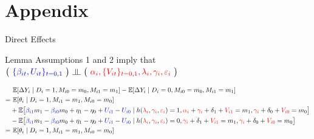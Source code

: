 \documentclass[aspectratio=1610, 9pt]{beamer}
\newcommand{\indep}{\rotatebox[origin=c]{90}{$\models$}}
\begin{document}
\appendix

\section{Appendix}



\begin{frame}{Direct Effects}

\begin{block}{Lemma}
   Assumptions 1 and 2 imply that $  \big(\ \textcolor{blue}{\{\beta_{it},U_{it}\}_{t=0,1}} \ \big) \ \indep\ \big(\ \textcolor{red}{\alpha_i,\{V_{it}\}_{t=0,1},\lambda_i,\gamma_i,\varepsilon_i}\ \big)$
\end{block}

\begin{align*}
    &\ \mathbb E[\Delta Y_i \mid D_i=1, M_{i0}=m_0, M_{i1}=m_1]- \mathbb E[\Delta Y_i \mid D_i=0, M_{i0}=m_0, M_{i1}=m_1]\\
    =&\ \mathbb E[\theta_i \mid D_i=1, M_{i1}=m_1, M_{i0}=m_0]\\
    & + \mathbb E\big[\textcolor{blue}{\beta_{i1}}m_{1}-\textcolor{blue}{\beta_{i0}}m_{0}+\eta_1-\eta_0 + \textcolor{blue}{U_{i1}}-\textcolor{blue}{U_{i0}}\mid h(\textcolor{red}{\lambda_i}, \textcolor{red}{\gamma_i},\textcolor{red}{\varepsilon_i})=1, \textcolor{red}{\alpha_i}+\textcolor{red}{\gamma_i}+\delta_1+\textcolor{red}{V_{i1}}=m_1, \textcolor{red}{\gamma_i}+\delta_0+\textcolor{red}{V_{i0}}=m_0\big]\\
    & -\mathbb E\big[\textcolor{blue}{\beta_{i1}}m_{1}-\textcolor{blue}{\beta_{i0}}m_{0}+\eta_1-\eta_0 + \textcolor{blue}{U_{i1}}-\textcolor{blue}{U_{i0}}\mid h(\textcolor{red}{\lambda_i},\textcolor{red}{\gamma_i},\textcolor{red}{\varepsilon_i})=0, \textcolor{red}{\gamma_i}+\delta_1+\textcolor{red}{V_{i1}}=m_1, \textcolor{red}{\gamma_i}+\delta_0+\textcolor{red}{V_{i0}}=m_0\big]\\
    =&\ \mathbb E[\theta_i \mid D_i=1, M_{i1}=m_1, M_{i0}=m_0]
\end{align*}
    
\end{frame}
\end{document}
